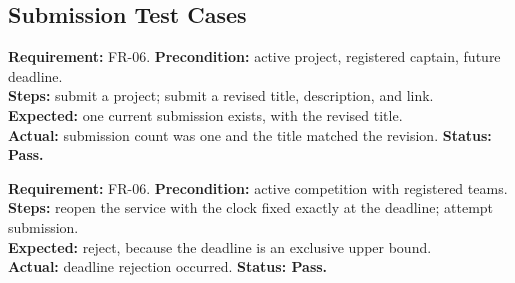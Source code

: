 \documentclass[12pt]{article}
\begin{document}
\subsection{Submission Test Cases}
\begin{contentbox}
\textbf{Requirement:} FR-06. \textbf{Precondition:} active project, registered captain, future deadline.\\
\textbf{Steps:} submit a project; submit a revised title, description, and link.\\
\textbf{Expected:} one current submission exists, with the revised title.\\
\textbf{Actual:} submission count was one and the title matched the revision. \textbf{Status: Pass.}
\end{contentbox}
\begin{contentbox}
\textbf{Requirement:} FR-06. \textbf{Precondition:} active competition with registered teams.\\
\textbf{Steps:} reopen the service with the clock fixed exactly at the deadline; attempt submission.\\
\textbf{Expected:} reject, because the deadline is an exclusive upper bound.\\
\textbf{Actual:} deadline rejection occurred. \textbf{Status: Pass.}
\end{contentbox}
\end{document}

